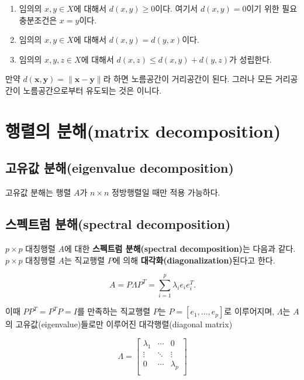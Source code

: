 \documentclass[b5paper,]{scrbook}
\theoremstyle{plain}
\theoremstyle{definition}
\numberwithin{equation}{section}
\begin{document}
\begin{enumerate}
\def\labelenumi{\arabic{enumi}.}
\item
  임의의 \(x,y\in X\)에 대해서 \(d(x,y)\geq 0\)이다. 여기서
  \(d(x,y)=0\)이기 위한 필요충분조건은 \(x=y\)이다.
\item
  임의의 \(x,y\in X\)에 대해서 \(d(x,y)=d(y,x)\)이다.
\item
  임의의 \(x,y,z\in X\)에 대해서 \(d(x,z)\leq d(x,y)+d(y,z)\)가
  성립한다.
\end{enumerate}

만약 \(d(\mathbf{x},\mathbf{y})=\| \mathbf{x}-\mathbf{y}\|\)라 하면
노름공간이 거리공간이 된다. 그러나 모든 거리공간이 노름공간으로부터
유도되는 것은 이니다.

\section{행렬의 분해(matrix decomposition)}\label{-matrix-decomposition}

\subsection{고유값 분해(eigenvalue
decomposition)}\label{-eigenvalue-decomposition}

고유값 분해는 행렬 \(A\)가 \(n\times n\) 정방행렬일 때만 적용 가능하다.

\subsection{스펙트럼 분해(spectral
decomposition)}\label{-spectral-decomposition}

\(p\times p\) 대칭행렬 \(A\)에 대한 \textbf{스펙트럼 분해(spectral
decomposition)}는 다음과 같다. \(p\times p\) 대칭행렬 \(A\)는 직교행렬
\(P\)에 의해 \textbf{대각화(diagonalization)}된다고 한다.

\[A=P\Lambda P^{T}=\sum_{i=1}^{p}\lambda_{i}e_{i}e_{i}^{T}.\]

이때 \(PP^{T}=P^{T}P=I\)를 만족하는 직교행렬 \(P\)는
\(P=[e_{1},\ldots , e_{p}]\)로 이루어지며, \(\Lambda\)는 \(A\)의
고유값(eigenvalue)들로만 이루어진 대각행렬(diagonal matrix)

\[
\Lambda=
\begin{bmatrix}
\lambda_{1} & \cdots & 0\\
\vdots & \ddots & \vdots\\
0 & \cdots & \lambda_{p}\\
\end{bmatrix}
\]
\end{document}
